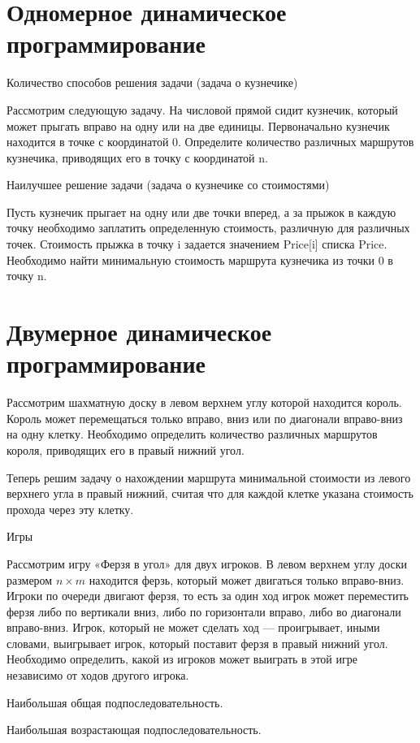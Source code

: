 \documentclass[14pt]{book}
\begin{document}
\section{Одномерное динамическое программирование}
Количество способов решения задачи (задача о кузнечике)

Рассмотрим следующую задачу. На числовой прямой сидит кузнечик, который может прыгать вправо на одну или на две единицы. Первоначально кузнечик находится в точке с координатой 0. Определите количество различных маршрутов кузнечика, приводящих его в точку с координатой n.

Наилучшее решение задачи (задача о кузнечике со стоимостями)

Пусть кузнечик прыгает на одну или две точки вперед, а за прыжок в каждую точку необходимо заплатить определенную стоимость, различную для различных точек. Стоимость прыжка в точку i задается значением Price[i] списка Price. Необходимо найти минимальную стоимость маршрута кузнечика из точки 0 в точку n.

\section{Двумерное динамическое программирование}

Рассмотрим шахматную доску в левом верхнем углу которой находится король. Король может перемещаться только вправо, вниз или по диагонали вправо-вниз на одну клетку. Необходимо определить количество различных маршрутов короля, приводящих его в правый нижний угол.

Теперь решим задачу о нахождении маршрута минимальной стоимости из левого верхнего угла в правый нижний, считая что для каждой клетке указана стоимость прохода через эту клетку.

Игры

Рассмотрим игру «Ферзя в угол» для двух игроков. В левом верхнем углу доски размером $n \times m$ 
находится ферзь, который может двигаться только вправо-вниз. Игроки по очереди двигают ферзя, то есть 
за один ход игрок может переместить ферзя либо по вертикали вниз, либо по горизонтали вправо, либо во 
диагонали вправо-вниз. Игрок, который не может сделать ход — проигрывает, иными словами, выигрывает 
игрок, который поставит ферзя в правый нижний угол. Необходимо определить, какой из игроков может 
выиграть в этой игре независимо от ходов другого игрока.

Наибольшая общая подпоследовательность.

Наибольшая возрастающая подпоследовательность.
\end{document}
